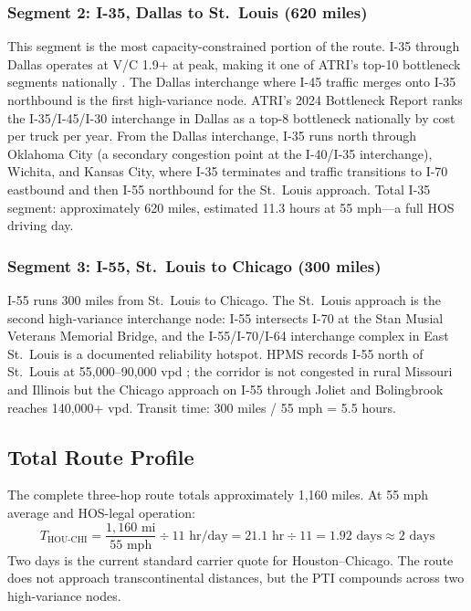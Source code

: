 \subsubsection{Segment 2: I-35, Dallas to St.\ Louis (620 miles)}

This segment is the most capacity-constrained portion of the route. I-35 through Dallas operates at V/C 1.9+ at peak, making it one of ATRI's top-10 bottleneck segments nationally \citep{ATRI_costs2024}. The Dallas interchange where I-45 traffic merges onto I-35 northbound is the first high-variance node. ATRI's 2024 Bottleneck Report ranks the I-35/I-45/I-30 interchange in Dallas as a top-8 bottleneck nationally by cost per truck per year. From the Dallas interchange, I-35 runs north through Oklahoma City (a secondary congestion point at the I-40/I-35 interchange), Wichita, and Kansas City, where I-35 terminates and traffic transitions to I-70 eastbound and then I-55 northbound for the St.\ Louis approach. Total I-35 segment: approximately 620 miles, estimated 11.3 hours at 55 mph---a full HOS driving day.

\subsubsection{Segment 3: I-55, St.\ Louis to Chicago (300 miles)}

I-55 runs 300 miles from St.\ Louis to Chicago. The St.\ Louis approach is the second high-variance interchange node: I-55 intersects I-70 at the Stan Musial Veterans Memorial Bridge, and the I-55/I-70/I-64 interchange complex in East St.\ Louis is a documented reliability hotspot. HPMS records I-55 north of St.\ Louis at 55,000--90,000 vpd \citep{HPMS2018}; the corridor is not congested in rural Missouri and Illinois but the Chicago approach on I-55 through Joliet and Bolingbrook reaches 140,000+ vpd. Transit time: 300 miles / 55 mph = 5.5 hours.

\subsection{Total Route Profile}

The complete three-hop route totals approximately 1,160 miles. At 55 mph average and HOS-legal operation:
\begin{equation}
  T_{\text{HOU-CHI}} = \frac{1{,}160 \text{ mi}}{55 \text{ mph}} \div 11 \text{ hr/day} = 21.1 \text{ hr} \div 11 = 1.92 \text{ days} \approx 2 \text{ days}
\end{equation}
Two days is the current standard carrier quote for Houston--Chicago. The route does not approach transcontinental distances, but the PTI compounds across two high-variance nodes.

